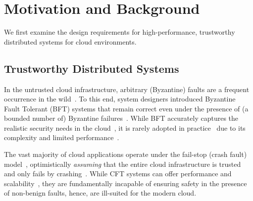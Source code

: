 \section{Motivation and Background}
\label{sec:requirements-ds}

We first examine the design requirements for high-performance, trustworthy distributed systems for cloud environments. %

\subsection{Trustworthy Distributed Systems}\label{subsec:trustworthy_ds}
In the untrusted cloud infrastructure, arbitrary (Byzantine) faults are a frequent occurrence in the wild~\cite{Gunawi_bugs-in-the-cloud, Shinde2016, 10.1145/1189256.1189259, 10.5555/1267308.1267318}. To this end, system designers introduced Byzantine Fault Tolerant (BFT) systems that remain correct even under the presence of (a bounded number of) Byzantine failures~\cite{Lamport:1982}.  While BFT accurately captures the realistic security needs in the cloud~\cite{bft_made_practical}, it is rarely adopted in practice~\cite{bftForSkeptics} due to its complexity and limited performance~\cite{268273, 10.1145/2658994}. 

The vast majority of cloud applications operate under the fail-stop (crash fault) model~\cite{spanner, 27897, cockroachdb_raft, zippydb, foundationdb}, optimistically {\em assuming} that the entire cloud infrastructure is trusted and only fails by crashing~\cite{delporte}.  While CFT systems can offer performance and scalability~\cite{f04eb9b864204bab958e72055062748c}, they are fundamentally incapable of ensuring safety in the presence of non-benign faults, hence, are ill-suited for the modern cloud. 

